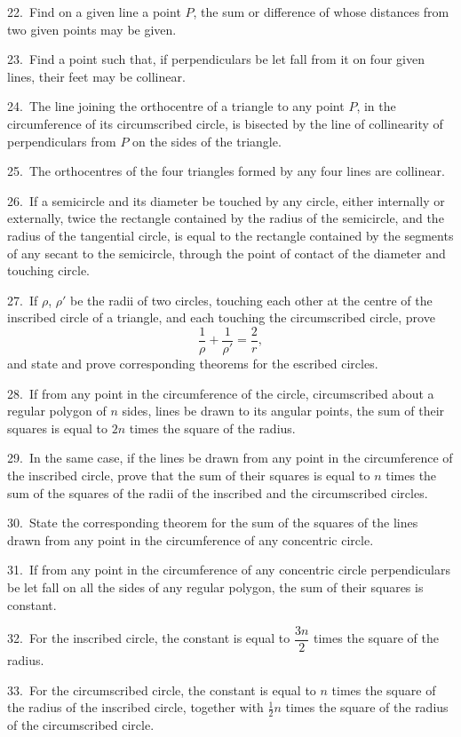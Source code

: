 \documentclass[oneside]{book}
\begin{document}
\begin{footnotesize}
22.~Find on a given line a point $P$, the sum or difference of
whose distances from two given points may be given.

23.~Find a point such that, if perpendiculars be let fall from it
on four given lines, their feet may be collinear.

24.~The line joining the orthocentre of a triangle to any point
$P$, in the circumference of its circumscribed circle, is bisected by
the line of collinearity of perpendiculars from $P$ on the sides of
the triangle.

25.~The orthocentres of the four triangles formed by any four
lines are collinear.

26.~If a semicircle and its diameter be touched by any circle,
either internally or externally, twice the rectangle contained by
the radius of the semicircle, and the radius of the tangential circle,
is equal to the rectangle contained by the segments of any secant
to the semicircle, through the point of contact of the diameter and
touching circle.

27.~If $\rho$, $\rho'$ be the radii of two circles, touching each other at
the centre of the inscribed circle of a triangle, and each touching
the circumscribed circle, prove
\[
\frac{ 1 }{\rho} + \frac{1 }{\rho'}  = \frac{2 }{r} ,
\]
and state and prove corresponding theorems for the escribed
circles.

28.~If from any point in the circumference of the circle, circumscribed
about a regular polygon of $n$ sides, lines be drawn to
its angular points, the sum of their squares is equal to $2n$ times
the square of the radius.

29.~In the same case, if the lines be drawn from any point in
the circumference of the inscribed circle, prove that the sum of
their squares is equal to $n$ times the sum of the squares of the
radii of the inscribed and the circumscribed circles.

30.~State the corresponding theorem for the sum of the squares
of the lines drawn from any point in the circumference of any
concentric circle.

31.~If from any point in the circumference of any concentric
circle perpendiculars be let fall on all the sides of any regular
polygon, the sum of their squares is constant.

32.~For the inscribed circle, the constant is equal to $\dfrac{3n}{ 2}$ times
the square of the radius.

33.~For the circumscribed circle, the constant is equal to $n$
times the square of the radius of the inscribed circle, together with
$\frac{ 1}{ 2} n$ times the square of the radius of the circumscribed circle.


\end{footnotesize}
\end{document}
